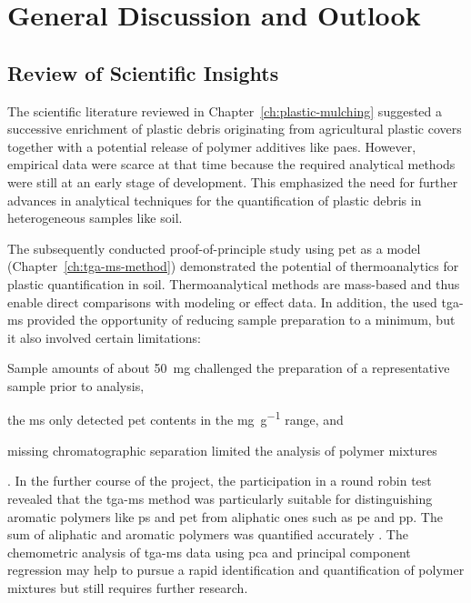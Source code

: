 
\chapter{General Discussion and Outlook}
\label{ch:general-discussion}

\section{Review of Scientific Insights}
\label{sec:general-discussion:review}

The scientific literature reviewed in Chapter~\ref{ch:plastic-mulching} suggested a successive enrichment of plastic debris originating from agricultural plastic covers together with a potential release of polymer additives like \acp{pae}. However, empirical data were scarce at that time because the required analytical methods were still at an early stage of development. This emphasized the need for further advances in analytical techniques for the quantification of plastic debris in heterogeneous samples like soil.

The subsequently conducted proof-of-principle study using \ac{pet} as a model (Chapter~\ref{ch:tga-ms-method}) demonstrated the potential of thermoanalytics for plastic quantification in soil. Thermoanalytical methods are mass-based and thus enable direct comparisons with modeling or effect data. In addition, the used \ac{tga-ms} provided the opportunity of reducing sample preparation to a minimum, but it also involved certain limitations:
\begin{enumerate*}
	\item Sample amounts of about \SI{50}{\milli\gram} challenged the preparation of a representative sample prior to analysis,
	\item the \ac{ms} only detected \ac{pet} contents in the \si{\milli\gram\per\gram} range, and
	\item missing chromatographic separation limited the analysis of polymer mixtures
\end{enumerate*}.
In the further course of the project, the participation in a round robin test revealed that the \ac{tga-ms} method was particularly suitable for distinguishing aromatic polymers like \ac{ps} and \ac{pet} from aliphatic ones such as \ac{pe} and \ac{pp}. The sum of aliphatic and aromatic polymers was quantified accurately \citep{BeckerQuantification2020}. The chemometric analysis of \ac{tga-ms} data using \ac{pca} and principal component regression may help to pursue a rapid identification and quantification of polymer mixtures \citep{DavidIntroducing2019} but still requires further research.

